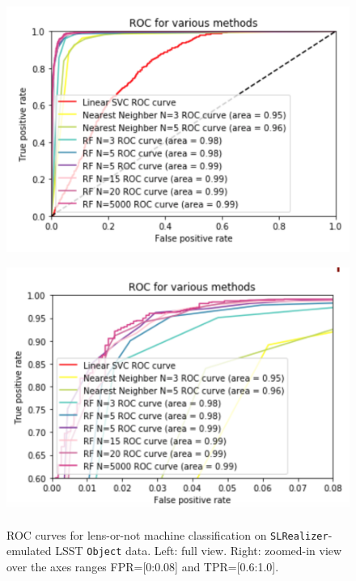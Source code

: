 \documentclass[\docopts]{\docclass}
\def\SLRealizer{\texttt{SLRealizer}\xspace}
\def\Object{\texttt{Object}\xspace}
\begin{document}
\begin{figure}
    \centering
    \begin{minipage}{0.48\linewidth}        %
        \centering
        \includegraphics[width=\linewidth]{ML_notmagnified.png}
    \end{minipage}\hfill
    \begin{minipage}{0.48\linewidth}        %
        \centering
        \includegraphics[width=\linewidth]{ML_magnified.png}
         \label{fig:ML Magnified}
    \end{minipage}
    \caption{ROC curves for lens-or-not machine classification on \SLRealizer-emulated LSST \Object data. Left: full view. Right: zoomed-in view over the axes ranges FPR=[0:0.08] and TPR=[0.6:1.0].}
    \label{fig:roc}
\end{figure}
\end{document}

